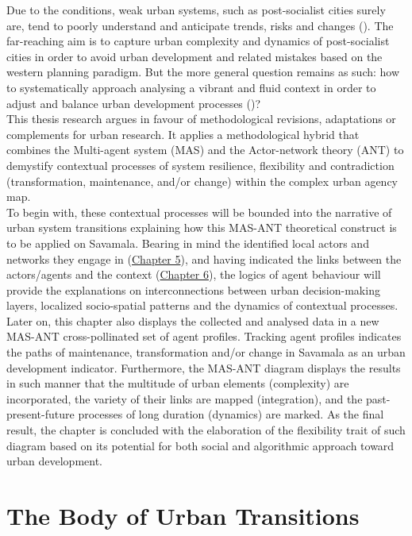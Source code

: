 \documentclass[11pt]{report}
\begin{document}
Due to the conditions, weak urban systems, such as post-socialist cities surely are, tend to poorly understand and anticipate trends, risks and changes (\href{UN}{\cite{un_habitat_state_2012}}). 
The far-reaching aim is to capture urban complexity and dynamics of post-socialist cities in order to avoid urban development and related mistakes based on the western planning paradigm. 
But the more general question remains as such: how to systematically approach analysing a vibrant and fluid context in order to adjust and balance urban development processes (\href{Bolay}{\cite{bolay_technology_2011}})?
\\

This thesis research argues in favour of methodological revisions, adaptations or complements for urban research. It applies a methodological hybrid that combines the Multi-agent system (MAS) and the Actor-network theory (ANT) to demystify contextual processes of system resilience, flexibility and contradiction (transformation, maintenance, and/or change) within the complex urban agency map.
\\

To begin with, these contextual processes will be bounded into the narrative of urban system transitions explaining how this MAS-ANT theoretical construct is to be applied on Savamala.
Bearing in mind the identified local actors and networks they engage in (\href{Chapter 5}{Chapter 5}), and having indicated the links between the actors/agents and the context (\href{Chapter 6}{Chapter 6}), the logics of agent behaviour will provide the explanations on interconnections between urban decision-making layers, localized socio-spatial patterns and the dynamics of contextual processes.
Later on, this chapter also displays the collected and analysed data in a new MAS-ANT cross-pollinated set of agent profiles.
Tracking agent profiles indicates the paths of maintenance, transformation and/or change in Savamala as an urban development indicator.
Furthermore, the MAS-ANT diagram displays the results in such manner that the multitude of urban elements (complexity) are incorporated, the variety of their links are mapped (integration), and the past-present-future processes of long duration (dynamics) are marked.
As the final result, the chapter is concluded with the elaboration of the flexibility trait of such diagram based on its potential for both social and algorithmic approach toward urban development.

\section{The Body of Urban Transitions}
\end{document}
